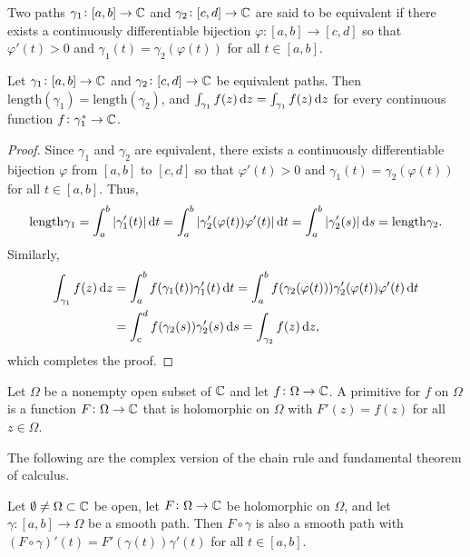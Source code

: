 \documentclass[11pt,a4paper]{article}
\newcommand{\length}{\mathrm{length}}
\begin{document}
\begin{definition}
  Two paths $\gamma_1 \colon [a, b] \to \mathbb{C}$ and 
  $\gamma_2 \colon [c, d] \to \mathbb{C}$ are said to be
  equivalent if there exists a continuously differentiable bijection 
  $\varphi \colon [a, b] \to [c, d]$ so
  that $\varphi'(t) > 0$ and $\gamma_1(t) = \gamma_2(\varphi(t))$
  for all $t \in [a, b]$.
\end{definition}

\begin{proposition}
  Let $\gamma_1 \colon [a,b] \to \mathbb{C}$ and $\gamma_2 \colon [c,d] \to \mathbb{C}$
  be equivalent paths.
  Then $\length(\gamma_1) = \length(\gamma_2)$, and
  $\int_{\gamma_1} f(z) \dz = \int_{\gamma_1} f(z) \dz$ for every continuous
  function $f \colon \gamma_1^* \to \mathbb{C}$.
\end{proposition}
\begin{proof}
  Since $\gamma_1$ and $\gamma_2$ are equivalent,
  there exists a continuously differentiable bijection 
  $\varphi$ from $[a, b]$ to $[c, d]$ so
  that $\varphi'(t) > 0$ and $\gamma_1(t) = \gamma_2(\varphi(t))$
  for all $t \in [a, b]$. Thus,
  \[
    \length{\gamma_1} =
    \int_{a}^{b} |\gamma_1'(t)| \dt =
    \int_{a}^{b} |\gamma_2'(\varphi(t)) \varphi'(t)| \dt =
    \int_{a}^{b} |\gamma_2'(s)| \ds =
    \length{\gamma_2}.
  \]
  Similarly,
  \begin{align*}
    \int_{\gamma_1} f(z) \dz &=
    \int_{a}^{b} f(\gamma_1(t)) \gamma_1'(t) \dt =
    \int_{a}^{b} f(\gamma_2(\varphi(t))) \gamma_2'(\varphi(t)) \varphi'(t) \dt
                          \\ &=
    \int_{c}^{d} f(\gamma_2(s)) \gamma_2'(s) \ds =
    \int_{\gamma_2} f(z) \dz,
  \end{align*}
  which completes the proof.
\end{proof}

\begin{definition}
  Let $\Omega$ be a nonempty open subset of $\mathbb{C}$ and let
  $f \colon \Omega \to \mathbb{C}$.
  A primitive for $f$ on $\Omega$ is a function $F \colon \Omega \to \mathbb{C}$
  that is holomorphic on $\Omega$ with $F'(z) = f(z)$ for all $z \in \Omega$.
\end{definition}

The following are the complex version of the chain rule and fundamental theorem
of calculus.

\begin{lemma}
  Let $\emptyset \neq \Omega \subset \mathbb{C}$ be open,
  let $F \colon \Omega \to \mathbb{C}$ be holomorphic on $\Omega$,
  and let $\gamma \colon [a, b] \to \Omega$ be a smooth path.
  Then $F \circ \gamma$ is also a smooth path with
  $(F \circ \gamma)'(t) = F'(\gamma(t))\gamma'(t)$ for all $t \in [a, b]$.
\end{lemma}
\end{document}
